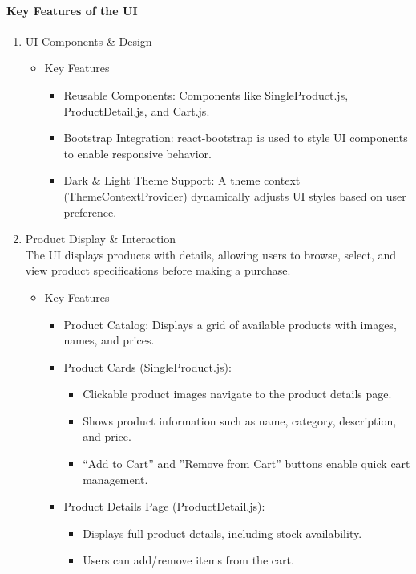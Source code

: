 \documentclass{llncs}
\begin{document}
\paragraph{Key Features of the UI}
\begin{enumerate}
    \item UI Components \& Design \\
          \begin{itemize}
              \item Key Features
                    \begin{itemize}
                        \item Reusable Components: Components like SingleProduct.js, ProductDetail.js, and Cart.js.
                        \item Bootstrap Integration: react-bootstrap is used to style UI components to enable responsive behavior.
                        \item Dark \& Light Theme Support: A theme context (ThemeContextProvider) dynamically adjusts UI styles based on user preference.
                    \end{itemize}
          \end{itemize}

    \item Product Display \& Interaction \\
          The UI displays products with details, allowing users to browse, select, and view product specifications before making a purchase.
          \begin{itemize}
              \item Key Features
                    \begin{itemize}
                        \item Product Catalog: Displays a grid of available products with images, names, and prices.
                        \item Product Cards (SingleProduct.js):
                              \begin{itemize}
                                  \item Clickable product images navigate to the product details page.
                                  \item Shows product information such as name, category, description, and price.
                                  \item ``Add to Cart'' and ''Remove from Cart'' buttons enable quick cart management.
                              \end{itemize}
                        \item Product Details Page (ProductDetail.js):
                              \begin{itemize}
                                  \item Displays full product details, including stock availability.
                                  \item Users can add/remove items from the cart.\\


\end{itemize}
\end{itemize}
\end{itemize}
\end{enumerate}
\end{document}
